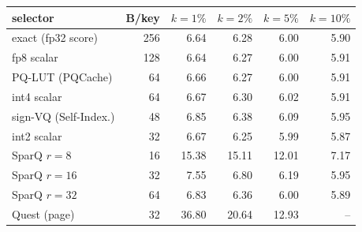 \begin{tabular}{l r r r r r}
\toprule
selector & B/key & $k{=}1\%$ & $k{=}2\%$ & $k{=}5\%$ & $k{=}10\%$ \\
\midrule
exact (fp32 score) & 256 & 6.64 & 6.28 & 6.00 & 5.90 \\
fp8 scalar & 128 & 6.64 & 6.27 & 6.00 & 5.91 \\
PQ-LUT (PQCache) & 64 & 6.66 & 6.27 & 6.00 & 5.91 \\
int4 scalar & 64 & 6.67 & 6.30 & 6.02 & 5.91 \\
sign-VQ (Self-Index.) & 48 & 6.85 & 6.38 & 6.09 & 5.95 \\
int2 scalar & 32 & 6.67 & 6.25 & 5.99 & 5.87 \\
SparQ $r{=}8$ & 16 & 15.38 & 15.11 & 12.01 & 7.17 \\
SparQ $r{=}16$ & 32 & 7.55 & 6.80 & 6.19 & 5.95 \\
SparQ $r{=}32$ & 64 & 6.83 & 6.36 & 6.00 & 5.89 \\
Quest (page) & 32 & 36.80 & 20.64 & 12.93 & -- \\
\bottomrule
\end{tabular}
